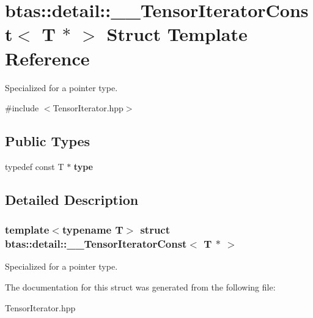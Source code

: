 \hypertarget{structbtas_1_1detail_1_1_____tensor_iterator_const_3_01_t_01_5_01_4}{
\section{btas::detail::\_\-\_\-TensorIteratorConst$<$ T $\ast$ $>$ Struct Template Reference}
\label{structbtas_1_1detail_1_1_____tensor_iterator_const_3_01_t_01_5_01_4}
}


Specialized for a pointer type.  


{\ttfamily \#include $<$TensorIterator.hpp$>$}\subsection*{Public Types}
\begin{DoxyCompactItemize}
\item 
\hypertarget{structbtas_1_1detail_1_1_____tensor_iterator_const_3_01_t_01_5_01_4_af152eda076a0f0c0855edab486956565}{
typedef const T $\ast$ {\bfseries type}}
\label{structbtas_1_1detail_1_1_____tensor_iterator_const_3_01_t_01_5_01_4_af152eda076a0f0c0855edab486956565}

\end{DoxyCompactItemize}


\subsection{Detailed Description}
\subsubsection*{template$<$typename T$>$ struct btas::detail::\_\-\_\-TensorIteratorConst$<$ T $\ast$ $>$}

Specialized for a pointer type. 

The documentation for this struct was generated from the following file:\begin{DoxyCompactItemize}
\item 
TensorIterator.hpp\end{DoxyCompactItemize}
